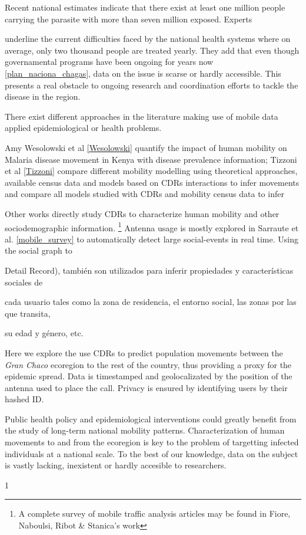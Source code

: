 Recent national estimates indicate that there exist at least one million people carrying the parasite with more than seven million exposed. Experts \begin{comment}  aca como referencio a Diego Weinberg y Mundo Sano? \end{comment} underline the current difficulties faced by the national health systems where on average, only two thousand people are treated yearly. They add that even though governamental programs have been ongoing for years now \ref{plan_naciona_chagas}, data on the issue is scarse or hardly accessible. This presents a real obstacle to ongoing research and coordination efforts to tackle the disease in the region.

There exist different approaches in the literature making use of mobile data applied epidemiological or health problems.\begin{comment} La siguiente info la saco de aqui  https://docs.google.com/document/d/1ZClgYFTLCxmg7wvRXqz2V1EP7Wcg0vd2ZwEBOLW2VOk \end{comment} Amy Wesolowski et al \ref{Wesolowski}  quantify the impact of human mobility on Malaria disease movement in Kenya with disease prevalence information; Tizzoni et al \ref{Tizzoni} compare different mobility modelling using theoretical approaches, available census data and models based on CDRs interactions to infer movements and compare all models studied with CDRs and mobility census data to infer

Other works directly study CDRs to characterize human mobility and other sociodemographic information. \footnote{A complete survey of mobile traffic analysis articles may be found in Fiore, Naboulsi, Ribot & Stanica's work} Antenna usage is mostly explored in Sarraute et al. \ref{mobile_survey} to automatically detect large social-events in real time. Using the social graph to 


Detail Record), también son utilizados para inferir propiedades y características sociales de

cada usuario tales como la zona de residencia, el entorno social, las zonas por las que transita,

su edad y género, etc.


Here we explore the use CDRs to predict population movements between the \textit{Gran Chaco} ecoregion to the rest of the country, thus providing a proxy for the epidemic spread. Data is timestamped and geolocalizated by the position of the antenna used to place the call. Privacy is ensured by identifying users by their hashed ID. \begin{comment}el tema de la privacidad es siempre tan importante que lo pongo aca... haria falta agregar que no tenemos acceso a las claves de encriptacion. \end{comment}

Public health policy and epidemiological interventions could greatly benefit from the study of long-term national mobility patterns. Characterization of human movements to and from the ecoregion is key to the problem of targetting infected individuals at a national scale. To the best of our knowledge, data on the subject is vastly lacking, inexistent or hardly accesible to researchers. 

1
